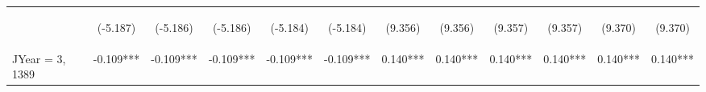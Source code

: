 \documentclass[]{article}
\begin{document}
\begin{center}
\begin{tabular}{lccccccccccc}
        \vspace{4pt}     & \begin{footnotesize}(-5.187)\end{footnotesize} & \begin{footnotesize}(-5.186)\end{footnotesize} & \begin{footnotesize}(-5.186)\end{footnotesize} & \begin{footnotesize}(-5.184)\end{footnotesize} & \begin{footnotesize}(-5.184)\end{footnotesize} & \begin{footnotesize}(9.356)\end{footnotesize}   & \begin{footnotesize}(9.356)\end{footnotesize}   & \begin{footnotesize}(9.357)\end{footnotesize}  & \begin{footnotesize}(9.357)\end{footnotesize}  & \begin{footnotesize}(9.370)\end{footnotesize}  & \begin{footnotesize}(9.370)\end{footnotesize}  \\
        JYear = 3, 1389  & -0.109***                                      & -0.109***                                      & -0.109***                                      & -0.109***                                      & -0.109***                                      & 0.140***                                        & 0.140***                                        & 0.140***                                       & 0.140***                                       & 0.140***                                       & 0.140***                                       \\

\end{tabular}
\end{center}
\end{document}
